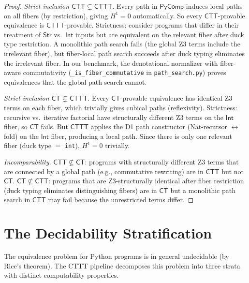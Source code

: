 \documentclass[11pt,a4paper]{report}
\theoremstyle{definition}
\theoremstyle{plain}
\newcommand{\Hone}{H^1}
\begin{document}
\begin{proof}
\emph{Strict inclusion $\mathsf{CTT} \subsetneq \mathsf{CTTT}$}.
Every path in $\mathsf{PyComp}$ induces local paths on all fibers
(by restriction), giving $\Hone = 0$ automatically.  So every
$\mathsf{CTT}$-provable equivalence is $\mathsf{CTTT}$-provable.
Strictness: consider programs that differ in their treatment of
$\mathsf{Str}$ vs.\ $\mathsf{Int}$ inputs but are equivalent on the
relevant fiber after duck type restriction.  A monolithic path search
fails (the global Z3 terms include the irrelevant fiber), but
fiber-local path search succeeds after duck typing eliminates the
irrelevant fiber.  In our benchmark, the denotational normalizer with
fiber-aware commutativity (\texttt{\_is\_fiber\_commutative} in
\texttt{path\_search.py}) proves equivalences that the global path
search cannot.

\emph{Strict inclusion $\mathsf{CT} \subsetneq \mathsf{CTTT}$}.
Every $\mathsf{CT}$-provable equivalence has identical Z3 terms on
each fiber, which trivially gives cubical paths (reflexivity).
Strictness: recursive vs.\ iterative factorial have structurally
different Z3 terms on the $\mathsf{Int}$ fiber, so
$\mathsf{CT}$ fails.  But $\mathsf{CTTT}$ applies the D1 path
constructor (Nat-recursor $\leftrightarrow$ fold) on the
$\mathsf{Int}$ fiber, producing a local path.  Since there is only
one relevant fiber (duck type $=$ \texttt{int}), $\Hone = 0$ trivially.

\emph{Incomparability}.  $\mathsf{CTT} \not\subseteq \mathsf{CT}$:
programs with structurally different Z3 terms that are connected by
a global path (e.g., commutative rewriting) are in $\mathsf{CTT}$
but not $\mathsf{CT}$.  $\mathsf{CT} \not\subseteq \mathsf{CTT}$:
programs that are Z3-structurally identical after fiber restriction
(duck typing eliminates distinguishing fibers) are in $\mathsf{CT}$
but a monolithic path search in $\mathsf{CTT}$ may fail because the
unrestricted terms differ.
\end{proof}

\section{The Decidability Stratification}
\label{sec:decidability}

The equivalence problem for Python programs is in general undecidable
(by Rice's theorem).  The CTTT pipeline decomposes this problem into
three strata with distinct computability properties.
\end{document}
